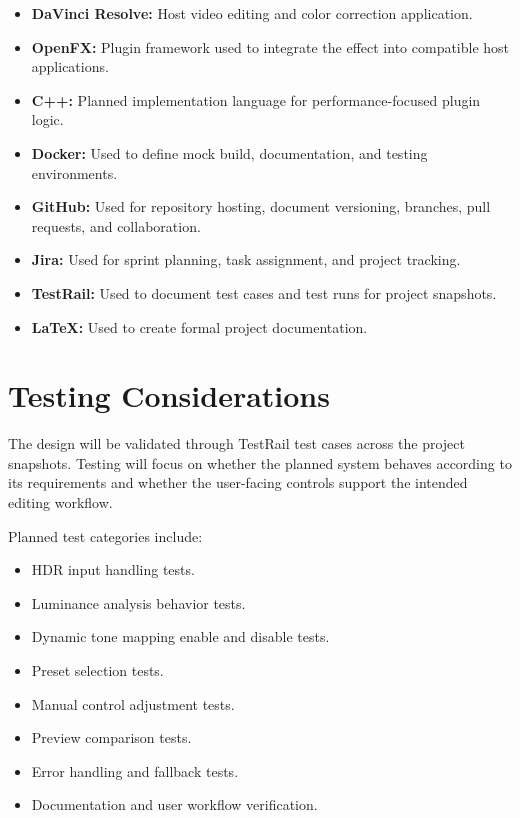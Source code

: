 \documentclass[12pt,hyphens]{article}
\begin{document}
\begin{itemize}[leftmargin=0.35in]
    \item \textbf{DaVinci Resolve:} Host video editing and color correction application.
    \item \textbf{OpenFX:} Plugin framework used to integrate the effect into compatible host applications.
    \item \textbf{C++:} Planned implementation language for performance-focused plugin logic.
    \item \textbf{Docker:} Used to define mock build, documentation, and testing environments.
    \item \textbf{GitHub:} Used for repository hosting, document versioning, branches, pull requests, and collaboration.
    \item \textbf{Jira:} Used for sprint planning, task assignment, and project tracking.
    \item \textbf{TestRail:} Used to document test cases and test runs for project snapshots.
    \item \textbf{LaTeX:} Used to create formal project documentation.
\end{itemize}


\section{Testing Considerations}

The design will be validated through TestRail test cases across the project snapshots. Testing will focus on whether the planned system behaves according to its requirements and whether the user-facing controls support the intended editing workflow.

Planned test categories include:

\begin{itemize}[leftmargin=0.35in]
    \item HDR input handling tests.
    \item Luminance analysis behavior tests.
    \item Dynamic tone mapping enable and disable tests.
    \item Preset selection tests.
    \item Manual control adjustment tests.
    \item Preview comparison tests.
    \item Error handling and fallback tests.
    \item Documentation and user workflow verification.
\end{itemize}
\end{document}
